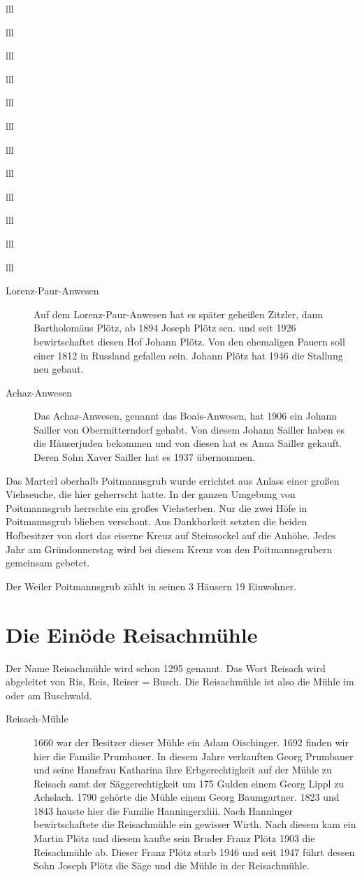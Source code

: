 \documentclass[12pt,a4pager]{book}
\begin{document}
\begin{tabuluar}{lll}
\begin{tabuluar}{lll}
\begin{tabuluar}{lll}
\begin{tabuluar}{lll}
\begin{tabuluar}{lll}
\begin{tabuluar}{lll}
\begin{tabuluar}{lll}
\begin{tabuluar}{lll}
\begin{tabuluar}{lll}
\begin{tabuluar}{lll}
\begin{tabuluar}{lll}
\begin{tabuluar}{lll}
\begin{description}
\item[Lorenz-Paur-Anwesen] Auf dem Lorenz-Paur-Anwesen hat es später geheißen Zitzler,
dann Bartholomäus Plötz, ab 1894 Joseph Plötz sen. und seit 1926 bewirtschaftet
diesen Hof Johann Plötz. Von den ehemaligen Pauern soll einer 1812 in Russland
gefallen sein. Johann Plötz hat 1946 die Stallung neu gebaut.

\item[Achaz-Anwesen] Das Achaz-Anwesen, genannt das Boais-Anwesen, hat 1906 ein Johann
Sailler von Obermitterndorf gehabt. Von diesem Johann Sailler haben es die
Häuserjuden bekommen und von diesen hat es Anna Sailler gekauft. Deren Sohn
Xaver Sailler hat es 1937 übernommen.
\end{description}

Das Marterl oberhalb Poitmannsgrub wurde errichtet aus Anlass einer großen
Viehseuche, die hier geherrscht hatte. In der ganzen Umgebung von Poitmannsgrub
herrschte ein großes Viehsterben. Nur die zwei Höfe in Poitmannsgrub blieben
verschont. Aus Dankbarkeit setzten die beiden Hofbesitzer von dort das eiserne
Kreuz auf Steinsockel auf die Anhöhe. Jedes Jahr am Gründonnerstag wird bei
diesem Kreuz von den Poitmannsgrubern gemeinsam gebetet.

Der Weiler Poitmannsgrub zählt in seinen 3 Häusern 19 Einwohner.

\section{Die Einöde Reisachmühle}

Der Name Reisachmühle wird schon 1295 genannt. Das Wort Reisach wird abgeleitet
von Ris, Reis, Reiser = Busch. Die Reisachmühle ist also die Mühle im oder am
Buschwald.

\begin{description}
\item[Reisach-Mühle] 1660 war der Besitzer dieser Mühle ein Adam Oischinger.
1692 finden wir hier die Familie Prumbauer. In diesem Jahre verkauften Georg
Prumbauer und seine Hausfrau Katharina ihre Erbgerechtigkeit auf der Mühle zu
Reisach samt der Säggerechtigkeit um 175 Gulden einem Georg Lippl zu Achslach.
1790 gehörte die Mühle einem Georg Baumgartner. 1823 und 1843 hauste hier die
Familie Hanningerxliii. Nach Hanninger bewirtschaftete die Reisachmühle ein
gewisser Wirth. Nach diesem kam ein Martin Plötz und diesem kaufte sein Bruder
Franz Plötz 1903 die Reisachmühle ab. Dieser Franz Plötz starb 1946 und seit
1947 führt dessen Sohn Joseph Plötz die Säge und die Mühle in der Reisachmühle.
\end{description}


\end{tabuluar}
\end{tabuluar}
\end{tabuluar}
\end{tabuluar}
\end{tabuluar}
\end{tabuluar}
\end{tabuluar}
\end{tabuluar}
\end{tabuluar}
\end{tabuluar}
\end{tabuluar}
\end{tabuluar}
\end{document}

